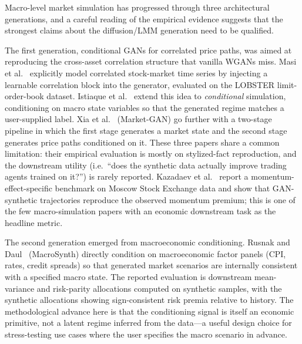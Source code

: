 Macro-level market simulation has progressed through three architectural generations, and a careful reading of the empirical evidence suggests that the strongest claims about the diffusion/LMM generation need to be qualified.

The first generation, conditional GANs for correlated price paths, was aimed at reproducing the cross-asset correlation structure that vanilla WGANs miss. Masi et al.~\citep{CoMeTS-GAN} explicitly model correlated stock-market time series by injecting a learnable correlation block into the generator, evaluated on the LOBSTER limit-order-book dataset. Istiaque et al.~\citep{istiaque2024cts} extend this idea to \emph{conditional} simulation, conditioning on macro state variables so that the generated regime matches a user-supplied label. Xia et al.~\citep{xia2024market} (Market-GAN) go further with a two-stage pipeline in which the first stage generates a market state and the second stage generates price paths conditioned on it. These three papers share a common limitation: their empirical evaluation is mostly on stylized-fact reproduction, and the downstream utility (i.e.\ ``does the synthetic data actually improve trading agents trained on it?'') is rarely reported. Kazadaev et al.~\citep{GAN-MoEx} report a momentum-effect-specific benchmark on Moscow Stock Exchange data and show that GAN-synthetic trajectories reproduce the observed momentum premium; this is one of the few macro-simulation papers with an economic downstream task as the headline metric.

The second generation emerged from macroeconomic conditioning. Rusnak and Daul~\citep{alex2024macroeconomic} (MacroSynth) directly condition on macroeconomic factor panels (CPI, rates, credit spreads) so that generated market scenarios are internally consistent with a specified macro state. The reported evaluation is downstream mean-variance and risk-parity allocations computed on synthetic samples, with the synthetic allocations showing sign-consistent risk premia relative to history. The methodological advance here is that the conditioning signal is itself an economic primitive, not a latent regime inferred from the data---a useful design choice for stress-testing use cases where the user specifies the macro scenario in advance.

